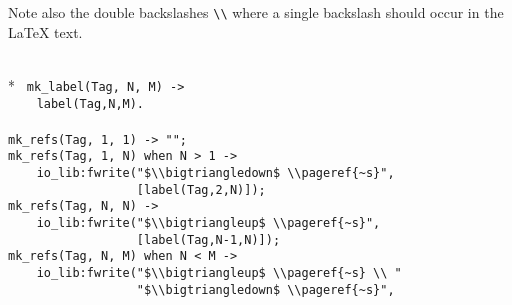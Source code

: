 Note also the double backslashes \verb+\\+ where a single backslash
should occur in the \LaTeX{} text.

\begin{flushleft}
\label{eweave_11_14}
\\*
\tt
\noindent{}%
\verb&mk_label(Tag, N, M) ->&\\
\noindent{}%
\verb&    label(Tag,N,M).&\\
\noindent{}%
\verb&&\\
\noindent{}%
\verb&mk_refs(Tag, 1, 1) -> "";&\\
\noindent{}%
\verb&mk_refs(Tag, 1, N) when N > 1 ->&\\
\noindent{}%
\verb&    io_lib:fwrite("$\\bigtriangledown$ \\pageref{~s}", &\\
\noindent{}%
\verb&                  [label(Tag,2,N)]);&\\
\noindent{}%
\verb&mk_refs(Tag, N, N) ->&\\
\noindent{}%
\verb&    io_lib:fwrite("$\\bigtriangleup$ \\pageref{~s}", &\\
\noindent{}%
\verb&                  [label(Tag,N-1,N)]);&\\
\noindent{}%
\verb&mk_refs(Tag, N, M) when N < M ->&\\
\noindent{}%
\verb&    io_lib:fwrite("$\\bigtriangleup$ \\pageref{~s} \\ "&\\
\noindent{}%
\verb&                  "$\\bigtriangledown$ \\pageref{~s}", &\\
\noindent{}%

\end{flushleft}

